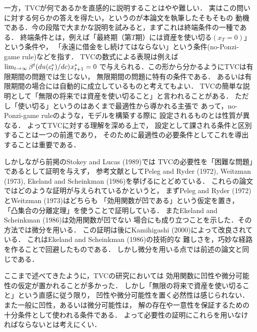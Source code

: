 \documentclass[a4paper,11pt]{jsarticle}
\begin{document}
一方，TVCが何であるかを直感的に説明することはやや難しい．
実はこの問いに対する何らかの答えを得たい，というのが本論文を執筆したそもそもの
動機である．今の段階で大まかな説明を試みると，まずこれは終端条件の一種である．
終端条件とは，例えば「最終期（第$T$期）には資産を使い切る$(x_T=0)$」という条件や，
「永遠に借金をし続けてはならない」という条件(no-Ponzi-game rule)などを指す．
TVCの数式による表現は例えば$\lim_{t \to \infty} \beta^t (du(c_t^*)/dc)\hspace{.2mm}x_{t+1}^*=0$
で与えられる．この形から分かるようにTVCは有限期間の問題では生じない，
無限期間の問題に特有の条件である．
あるいは有限期間の場合には自動的に成立しているものと考えてもよい．
TVCの簡単な説明として「無限の将来では資産を使い切ること」と言われることがある．
ただし「使い切る」というのはあくまで最適性から導かれる主張で
あって，no-Ponzi-game ruleのような，モデルを構築する際に
設定されるものとは性質が異なる．
よってTVCに対する理解を深める上で，
設定として課される条件と区別することは一つの前進であり，
そのために最適性の必要条件としてこれを導出することは重要である．

しかしながら前掲のStokey and Lucas (1989)では
TVCの必要性を「困難な問題」であるとして証明を与えず，
参考文献としてPeleg and Ryder (1972), Weitzman (1973), Ekeland and Scheinkman (1986)を挙げるにとどめている．
これらの論文ではどのような証明が与えられているかというと，
まずPeleg and Ryder (1972)とWeitzman (1973)はどちらも
「効用関数が凹である」という仮定を置き，
「凸集合の分離定理」を使うことで証明している．
またEkeland and Scheinkman (1986)は効用関数が凹でない
場合にも成り立つことを示した．その方法では微分を用いる．
この証明は後にKamihigashi (2000)によって改良されている．
これはEkeland and Scheinkman (1986)の技術的な
難しさを，巧妙な経路を作ることで回避したものである．
しかし微分を用いる点では前述の論文と同じである．

ここまで述べてきたように，TVCの研究においては
効用関数に凹性や微分可能性の仮定が置かれることが多かった．
しかし「無限の将来で資産を使い切ること」という直感に従う限り，
凹性や微分可能性を置く必然性は感じられない．
また一般に凹性，あるいは微分可能性は，
解の存在や一意性を保証するための十分条件として使われる条件である．
よって必要性の証明にこれらを用いなければならないとは考えにくい．
\end{document}

